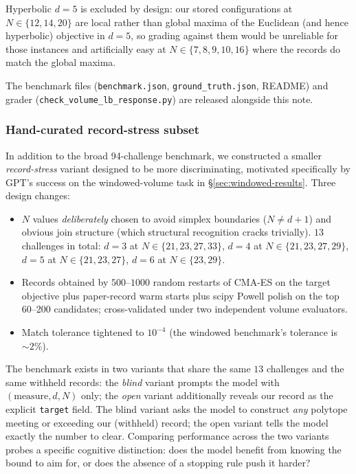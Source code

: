 \documentclass[11pt]{article}
\begin{document}
Hyperbolic $d = 5$ is excluded by design: our stored configurations
at $N \in \{12, 14, 20\}$ are local rather than global maxima
of the Euclidean (and hence hyperbolic) objective in $d = 5$, so
grading against them would be unreliable for those instances and
artificially easy at $N \in \{7, 8, 9, 10, 16\}$ where the records
do match the global maxima.

The benchmark files (\texttt{benchmark.json},
\texttt{ground\_truth.json}, README) and grader
(\texttt{check\_volume\_lb\_response.py}) are released alongside
this note.

\subsubsection{Hand-curated record-stress subset}
\label{sec:volume-record-stress}

In addition to the broad 94-challenge benchmark, we constructed a
smaller \emph{record-stress} variant designed to be more
discriminating, motivated specifically by GPT's success on the
windowed-volume task in \S\ref{sec:windowed-results}.  Three
design changes:

\begin{itemize}
\item $N$ values \emph{deliberately} chosen to avoid simplex
      boundaries ($N \neq d{+}1$) and obvious join structure
      (which structural recognition cracks trivially).
      $13$ challenges in total: $d = 3$ at $N \in \{21, 23, 27, 33\}$,
      $d = 4$ at $N \in \{21, 23, 27, 29\}$, $d = 5$ at
      $N \in \{21, 23, 27\}$, $d = 6$ at $N \in \{23, 29\}$.
\item Records obtained by $500$--$1000$ random restarts of CMA-ES
      on the target objective plus paper-record warm starts plus
      scipy Powell polish on the top 60--200 candidates;
      cross-validated under two independent volume evaluators.
\item Match tolerance tightened to $10^{-4}$ (the windowed
      benchmark's tolerance is $\sim 2\%$).
\end{itemize}

The benchmark exists in two variants that share the same $13$
challenges and the same withheld records:
the \emph{blind} variant prompts the model with $(\text{measure},
d, N)$ only; the \emph{open} variant additionally reveals our
record as the explicit \texttt{target} field.  The blind variant
asks the model to construct \emph{any} polytope meeting or
exceeding our (withheld) record; the open variant tells the model
exactly the number to clear.  Comparing performance across the two
variants probes a specific cognitive distinction: does the model
benefit from knowing the bound to aim for, or does the absence of
a stopping rule push it harder?
\end{document}

